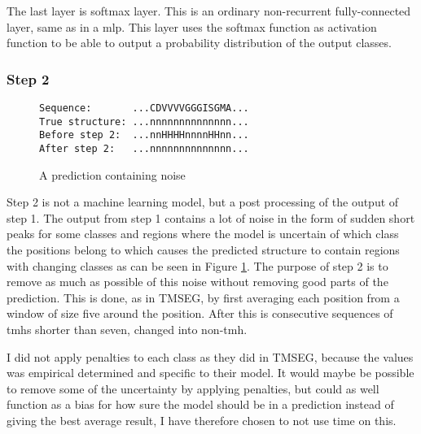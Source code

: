 The last layer is softmax layer. This is an ordinary non-recurrent fully-connected layer, same as in 
a \gls{mlp}. This layer uses the softmax function as activation function to be able to output 
a probability distribution of the output classes.
 
\subsubsection{Step 2}

\begin{figure}
	\centering
	\begin{BVerbatim}
Sequence:       ...CDVVVVGGGISGMA...
True structure: ...nnnnnnnnnnnnnn...
Before step 2:  ...nnHHHHnnnnHHnn...
After step 2:   ...nnnnnnnnnnnnnn...
	\end{BVerbatim}
	\caption{A prediction containing noise}
	\label{fig:noisy_prediction}
\end{figure}

Step 2 is not a machine learning model, but a post processing of the output of step 1. The output from 
step 1 contains a lot of noise in the form of sudden short peaks for some classes and regions where the 
model is uncertain of which class the positions belong to which causes the predicted structure to contain
regions with changing classes as can be seen in Figure \ref{fig:noisy_prediction}. The purpose of step 2
is to remove as much as possible of this noise without removing good parts of the prediction.
This is done, as in TMSEG, by first averaging each position from a window of size five around the position.
After this is consecutive sequences of \glspl{tmh} shorter than seven, changed into non-\gls{tmh}. 

I did not apply penalties to each class as they did in TMSEG, because the values was empirical determined 
and specific to their model. It would maybe be possible to remove some of the uncertainty by applying
penalties, but could as well function as a bias for how sure the model should be in a prediction instead 
of giving the best average result, I have therefore chosen to not use time on this.

